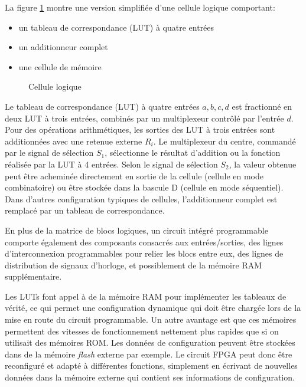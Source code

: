 \documentclass[letter, oneside]{book}
\begin{document}
La figure \ref{fig:orge98afe4} montre une version simplifiée d'une cellule
logique comportant:
\begin{itemize}
\item un tableau de correspondance (LUT) à quatre entrées
\item un additionneur complet
\item une cellule de mémoire
\end{itemize}

\begin{figure}[htbp]
\centering

\caption{\label{fig:orge98afe4}Cellule logique}
\end{figure}

Le tableau de correspondance (LUT) à quatre entrées \(a, b, c, d\) est
fractionné en deux LUT à trois entrées, combinés par un multiplexeur
contrôlé par l'entrée \(d\). Pour des opérations arithmétiques, les
sorties des LUT à trois entrées sont additionnées avec une retenue
externe \(R_i\). Le multiplexeur du centre, commandé par le signal de
sélection \(S_1\), sélectionne le résultat d'addition ou la fonction
réalisée par la LUT à 4 entrées. Selon le signal de sélection \(S_2\),
la valeur obtenue peut être acheminée directement en sortie de la
cellule (cellule en mode combinatoire) ou être stockée dans la bascule
D (cellule en mode séquentiel). Dans d'autres configuration typiques
de cellules, l'additionneur complet est remplacé par un tableau de
correspondance.

En plus de la matrice de blocs logiques, un circuit intégré
programmable comporte également des composants consacrés aux
entrées/sorties, des lignes d'interconnexion programmables pour relier
les blocs entre eux, des lignes de distribution de signaux d'horloge,
et possiblement de la mémoire RAM supplémentaire.

Les LUTs font appel à de la mémoire RAM pour implémenter les tableaux
de vérité, ce qui permet une configuration dynamique qui doit être
chargée lors de la mise en route du circuit programmable. Un autre
avantage est que ces mémoires permettent des vitesses de
fonctionnement nettement plus rapides que si on utilisait des mémoires
ROM.  Les données de configuration peuvent être stockées dans de la
mémoire \emph{flash} externe par exemple. Le circuit FPGA peut donc être
reconfiguré et adapté à différentes fonctions, simplement en écrivant
de nouvelles données dans la mémoire externe qui contient ses
informations de configuration.
\end{document}
